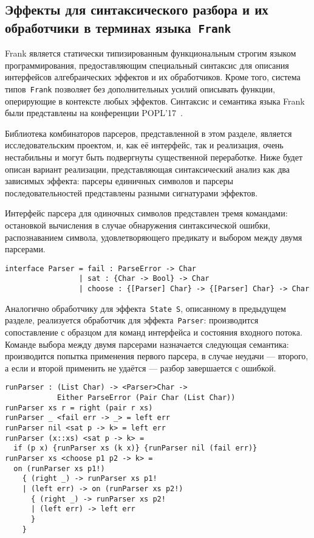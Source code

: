 \documentclass [a4paper] {article}
\begin{document}
\subsection{Эффекты для синтаксического разбора и их обработчики
            в терминах языка~\texttt{Frank}}

Frank является статически типизированным функциональным
строгим языком программирования, предоставляющим специальный синтаксис для
описания интерфейсов алгебраических эффектов и их обработчиков.
Кроме того, система типов~\texttt{Frank} позволяет без дополнительных усилий описывать
функции, оперирующие в контексте любых эффектов. Синтаксис и семантика языка
Frank были представлены на конференции POPL'17~\cite{Frank}.

Библиотека комбинаторов парсеров, представленной в этом разделе, является
исследовательским проектом, и, как её интерфейс, так и реализация, очень
нестабильны и могут быть подвергнуты существенной переработке.
Ниже будет описан вариант реализации, представляющая синтаксический анализ
как два зависимых эффекта: парсеры единичных символов и парсеры
последовательностей представлены разными сигнатурами эффектов.

Интерфейс парсера для одиночных символов представлен тремя командами: остановкой
вычисления в случае обнаружения синтаксической ошибки, распознаванием символа,
удовлетворяющего предикату и выбором между двумя парсерами.

\begin{verbatim}
interface Parser = fail : ParseError -> Char
                 | sat : {Char -> Bool} -> Char
                 | choose : {[Parser] Char} -> {[Parser] Char} -> Char
\end{verbatim}

Аналогично обработчику для эффекта~\texttt{State S}, описанному в предыдущем
разделе, реализуется обработчик для эффекта~\texttt{Parser}: производится
сопоставление с образцом для команд интерфейса и состояния входного потока.
Команде выбора между двумя парсерами назначается следующая семантика:
производится попытка применения первого парсера, в случае неудачи --- второго, а
если и второй применить не удаётся --- разбор завершается с ошибкой.

\begin{verbatim}
runParser : (List Char) -> <Parser>Char ->
            Either ParseError (Pair Char (List Char))
runParser xs r = right (pair r xs)
runParser _ <fail err -> _> = left err
runParser nil <sat p -> k> = left err
runParser (x::xs) <sat p -> k> =
  if (p x) {runParser xs (k x)} {runParser nil (fail err)}
runParser xs <choose p1 p2 -> k> =
  on (runParser xs p1!)
    { (right _) -> runParser xs p1!
    | (left err) -> on (runParser xs p2!)
      { (right _) -> runParser xs p2!
      | (left err) -> left err
      }
    }
\end{verbatim}
\end{document}

